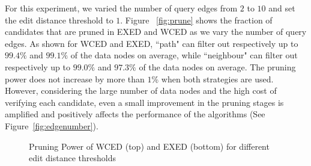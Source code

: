 \documentclass{sigmod}
\begin{document}
 For this experiment, we varied the number of query edges from $2$ to $10$ and set the edit distance threshold to $1$. Figure ~\ref{fig:prune} shows the fraction of candidates that are pruned in EXED and WCED as we vary the number of query edges.  As shown for WCED and EXED, ``path" can filter out respectively  up to $99.4\%$ and $99.1\%$ of the data nodes on average, while ``neighbour" can filter out respectively up to $99.0\%$ and  $97.3\%$ of the data nodes on average. The pruning power does not increase by more than $1$\% when both strategies are used. However, considering the large number of data nodes and the high cost of verifying each candidate, even a small improvement in the pruning stages is amplified and positively affects the performance of the algorithms (See Figure~\ref{fig:edgenumber}). 
\begin{figure}[htb]
\setlength{\belowcaptionskip}{-1\baselineskip}
\centering
{}
\vspace{-2\baselineskip}

\vspace{-2\baselineskip}
\caption{Pruning Power of WCED (top) and EXED (bottom) for different edit distance thresholds}
\label{fig:threshold}
\end{figure}
\end{document}
